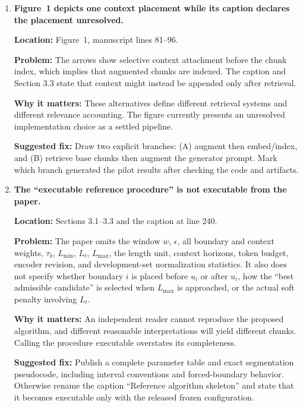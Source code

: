 \documentclass[11pt]{article}
\newcommand{\location}[1]{\textbf{Location:} #1}
\newcommand{\problem}{\textbf{Problem:} }
\newcommand{\impact}{\textbf{Why it matters:} }
\newcommand{\fix}{\textbf{Suggested fix:} }
\begin{document}
\begin{enumerate}
  \fix Either define an explicit mapping such as $(H_i^-,H_i^+,B_{\mathrm{ctx}},\boldsymbol\lambda_i)=f(\mathbf z_i)$, or narrow the claim to ``adaptive chunking followed by a separate relevance-based context selector.'' The confirmatory experiment should compare the same selector across fixed-size, similarity, pure-velocity, and full-STP chunks.

  \item \textbf{Figure~1 depicts one context placement while its caption declares the placement unresolved.}

  \location{Figure~1, manuscript lines 81--96.}

  \problem The arrows show selective context attachment before the chunk index, which implies that augmented chunks are indexed. The caption and Section 3.3 state that context might instead be appended only after retrieval.

  \impact These alternatives define different retrieval systems and different relevance accounting. The figure currently presents an unresolved implementation choice as a settled pipeline.

  \fix Draw two explicit branches: (A) augment then embed/index, and (B) retrieve base chunks then augment the generator prompt. Mark which branch generated the pilot results after checking the code and artifacts.

  \item \textbf{The ``executable reference procedure'' is not executable from the paper.}

  \location{Sections 3.1--3.3 and the caption at line 240.}

  \problem The paper omits the window $w$, $\epsilon$, all boundary and context weights, $\tau_b$, $L_{\min}$, $L_t$, $L_{\max}$, the length unit, context horizons, token budget, encoder revision, and development-set normalization statistics. It also does not specify whether boundary $i$ is placed before $u_i$ or after $u_i$, how the ``best admissible candidate'' is selected when $L_{\max}$ is approached, or the actual soft penalty involving $L_t$.

  \impact An independent reader cannot reproduce the proposed algorithm, and different reasonable interpretations will yield different chunks. Calling the procedure executable overstates its completeness.

  \fix Publish a complete parameter table and exact segmentation pseudocode, including interval conventions and forced-boundary behavior. Otherwise rename the caption ``Reference algorithm skeleton'' and state that it becomes executable only with the released frozen configuration.


\end{enumerate}
\end{document}
